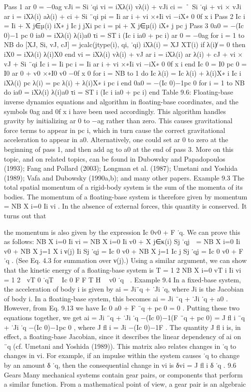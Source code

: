 Pass 1 ar 0 = −0ag vJi = Si ˙qi vi = iXλ(i) vλ(i) + vJi ci = ˚ Si ˙qi + vi × vJi ar i = iXλ(i) aλ(i) + ci + Si ¨qi pi = Ii ar i + vi ×∗Ii vi −iX∗ 0 0f x i Pass 2 Ic i = Ii + X j∈µ(i) iX∗ j Ic j jXi pc i = pi + X j∈µ(i) iX∗ j pc j Pass 3 0a0 = −(Ic 0)−1 pc 0 ia0 = iXλ(i) λ(i)a0 τi = ST i (Ic i ia0 + pc i) ar 0 = −0ag for i = 1 to NB do [XJ, Si, vJ, cJ] = jcalc(jtype(i), qi, ˙qi) iXλ(i) = XJ XT(i) if λ(i)̸ = 0 then iX0 = iXλ(i) λ(i)X0 end vi = iXλ(i) vλ(i) + vJ ar i = iXλ(i) ar λ(i) + cJ + vi × vJ + Si ¨qi Ic i = Ii pc i = Ii ar i + vi ×∗Ii vi −iX∗ 0 0f x i end Ic 0 = I0 pc 0 = I0 ar 0 + v0 ×∗I0 v0 −0f x 0 for i = NB to 1 do Ic λ(i) = Ic λ(i) + λ(i)X∗ i Ic i iXλ(i) pc λ(i) = pc λ(i) + λ(i)X∗ i pc i end 0a0 = −(Ic 0)−1pc 0 for i = 1 to NB do ia0 = iXλ(i) λ(i)a0 τi = ST i (Ic i ia0 + pc i) end Table 9.6: Floating-base inverse dynamics equations and algorithm in floating-base coordinates, and the symbols 0ag and 0f x i have been used accordingly. This algorithm handles gravity by initializing ar 0 to −ag rather than zero. This causes gravitational force terms to appear in pc i, which in turn cause the correct gravitational acceleration to appear in a0. Alternatively, one could set ar 0 to zero at the beginning of pass 1, and then add ag to a0 at the end of pass 3. More on this topic, and on related topics, can be found in Dubowsky and Papadopoulos (1993); Fang and Pollard (2003); Longman et al. (1987); Umetani and Yoshida (1989); Vafa and Dubowsky (1990a,b); and many other papers. Example 9.3 The total spatial momentum of a rigid-body system is the sum of the momenta of its bodies. The momentum of a floating-base system is therefore given by momentum = NB X i=0 Ii vi . In the absence of external forces, this quantity is conserved. It turns out that

the momentum is also given by the expression Ic 0v0 + F ˙q. We can prove this as follows: NB X i=0 Ii vi = NB X i=0 Ii   v0 + X j∈κ(i) Sj ˙qj  = NB X i=0 Ii v0 + NB X j=1 X i∈ν(j) Ii Sj ˙qj = Ic 0 v0 + NB X j=1 Ic j Sj ˙qj = Ic 0 v0 + F ˙q . (See Eq. 4.3 for summation over ν(j).) Using a similar argument, we can show that the kinetic energy of a floating-base system is T = 1 2 NB X i=0 vT i Ii vi = 1 2  vT 0 ˙qT  Ic 0 F F T H  v0 ˙q  . Example 9.4 In a fixed-base system, the acceleration of body i is given by ai = Ji¨q + ˙Ji ˙q, where Ji is the Jacobian of body i. In a floating-base system, this becomes ai = Ji ¨q + ˙Ji ˙q + a0 . However, from Eq. 9.13 we have Ic 0 a0 + F ¨q + pc 0 = 0 . Putting these two equations together, we get ai = Ji ¨q + ˙Ji ˙q −(Ic 0)−1(F ¨q + pc 0) = J fl i ¨q + ˙Ji ˙q −(Ic 0)−1pc 0 , where J fl i = Ji −(Ic 0)−1F . The quantity J fl i is, in effect, a floating-base Jacobian, since it describes the linear dependency of ai on ¨q (cf. Umetani and Yoshida (1989)). This matrix also relates changes in ˙q to changes in vi. For example, if an impulse within the system causes ˙q to change by an amount δ ˙q, then the consequential change in vi is δvi = J fl i δ ˙q . 9.6 Gears Many mechanical systems contain gear pairs, or components that perform a similar function. From a mathematical point of view, a gear pair is an algebraic

